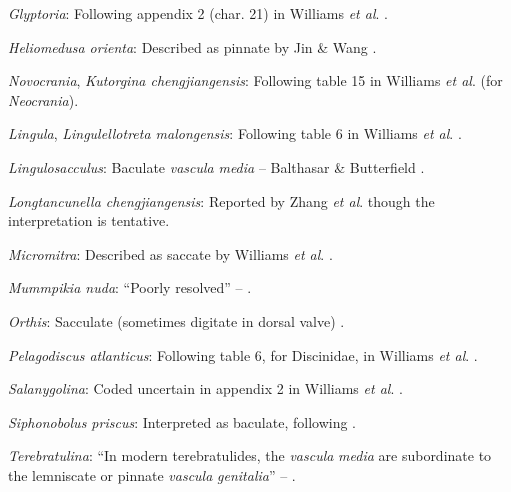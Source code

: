 \documentclass[openany]{book}
\begin{document}
\hypertarget{Glyptoria-coding-36}{}
\emph{Glyptoria}: Following appendix 2 (char. 21) in Williams \emph{et
al}. \citeyearpar{Williams1998Thediversity}.

\hypertarget{Heliomedusa_orienta-coding-36}{}
\emph{Heliomedusa orienta}: Described as pinnate by Jin \& Wang
\citeyearpar{Jin1992Revisionof}.

\hypertarget{Kutorgina_chengjiangensis-coding-36}{}
\emph{Novocrania}, \emph{Kutorgina chengjiangensis}: Following table 15
in Williams \emph{et al}.
\citeyearpar{Williams2000LinguliformeaCraniiformea} (for
\emph{Neocrania}).

\hypertarget{Lingula-coding-36}{}
\emph{Lingula}, \emph{Lingulellotreta malongensis}: Following table 6 in
Williams \emph{et al}.
\citeyearpar{Williams2000LinguliformeaCraniiformea}.

\hypertarget{Lingulosacculus-coding-36}{}
\emph{Lingulosacculus}: Baculate \emph{vascula} \emph{media} --
Balthasar \& Butterfield \citeyearpar{Balthasar2009EarlyCambrian}.

\hypertarget{Longtancunella_chengjiangensis-coding-36}{}
\emph{Longtancunella chengjiangensis}: Reported by Zhang \emph{et al}.
\citeyearpar[2011T]{Zhang2007Agregarious} though the interpretation is
tentative.

\hypertarget{Micromitra-coding-36}{}
\emph{Micromitra}: Described as saccate by Williams \emph{et al}.
\citeyearpar{Williams1998Thediversity}.

\hypertarget{Mummpikia_nuda-coding-36}{}
\emph{Mummpikia nuda}: ``Poorly resolved'' --
\citet{Balthasar2008iMummpikia}.

\hypertarget{Orthis-coding-36}{}
\emph{Orthis}: Sacculate (sometimes digitate in dorsal valve)
\citep[p716]{Williams2000LinguliformeaCraniiformea}.

\hypertarget{Pelagodiscus_atlanticus-coding-36}{}
\emph{Pelagodiscus atlanticus}: Following table 6, for Discinidae, in
Williams \emph{et al}.
\citeyearpar{Williams2000LinguliformeaCraniiformea}.

\hypertarget{Salanygolina-coding-36}{}
\emph{Salanygolina}: Coded uncertain in appendix 2 in Williams \emph{et
al}. \citeyearpar{Williams1998Thediversity}.

\hypertarget{Siphonobolus_priscus-coding-36}{}
\emph{Siphonobolus priscus}: Interpreted as baculate, following
\citet{Havlicek1982LingulaceaPaterinacea}.

\hypertarget{Terebratulina-coding-36}{}
\emph{Terebratulina}: ``In modern terebratulides, the \emph{vascula}
\emph{media} are subordinate to the lemniscate or pinnate \emph{vascula}
\emph{genitalia}'' -- \citet{Williams1997Introduction}.
\end{document}
